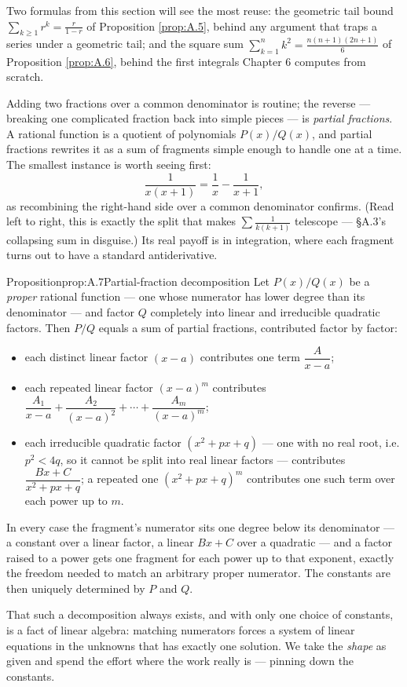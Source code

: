 \documentclass[a4paper,12pt,oneside]{memoir}
\begin{document}
Two formulas from this section will see the most reuse: the geometric tail bound \(\sum_{k \ge 1} r^{k} = \frac{r}{1 - r}\) of Proposition \ref{prop:A.5}, behind any argument that traps a series under a geometric tail; and the square sum \(\sum_{k=1}^{n} k^{2} = \frac{n(n+1)(2n+1)}{6}\) of Proposition \ref{prop:A.6}, behind the first integrals Chapter 6 computes from scratch.


Adding two fractions over a common denominator is routine; the reverse — breaking one complicated fraction back into simple pieces — is \emph{partial fractions}. A rational function is a quotient of polynomials \(P(x)/Q(x)\), and partial fractions rewrites it as a sum of fragments simple enough to handle one at a time. The smallest instance is worth seeing first: \[ \frac{1}{x(x + 1)} = \frac{1}{x} - \frac{1}{x + 1}, \] as recombining the right-hand side over a common denominator confirms. (Read left to right, this is exactly the split that makes \(\sum \tfrac{1}{k(k + 1)}\) telescope — §A.3’s collapsing sum in disguise.) Its real payoff is in integration, where each fragment turns out to have a standard antiderivative.

\begin{envproposition}{Proposition}{prop:A.7}{Partial-fraction decomposition}
Let \(P(x)/Q(x)\) be a \emph{proper} rational function — one whose numerator has lower degree than its denominator — and factor \(Q\) completely into linear and irreducible quadratic factors. Then \(P/Q\) equals a sum of partial fractions, contributed factor by factor:

\begin{itemize}
  \item each distinct linear factor \((x - a)\) contributes one term \(\dfrac{A}{x - a}\);
  \item each repeated linear factor \((x - a)^{m}\) contributes \(\dfrac{A_{1}}{x - a} + \dfrac{A_{2}}{(x - a)^{2}} + \cdots + \dfrac{A_{m}}{(x - a)^{m}}\);
  \item each irreducible quadratic factor \((x^{2} + px + q)\) — one with no real root, i.e. \(p^{2} < 4q\), so it cannot be split into real linear factors — contributes \(\dfrac{Bx + C}{x^{2} + px + q}\); a repeated one \((x^{2} + px + q)^{m}\) contributes one such term over each power up to \(m\).
\end{itemize}
In every case the fragment’s numerator sits one degree below its denominator — a constant over a linear factor, a linear \(Bx + C\) over a quadratic — and a factor raised to a power gets one fragment for each power up to that exponent, exactly the freedom needed to match an arbitrary proper numerator. The constants are then uniquely determined by \(P\) and \(Q\).
\end{envproposition}
That such a decomposition always exists, and with only one choice of constants, is a fact of linear algebra: matching numerators forces a system of linear equations in the unknowns that has exactly one solution. We take the \emph{shape} as given and spend the effort where the work really is — pinning down the constants.
\end{document}
